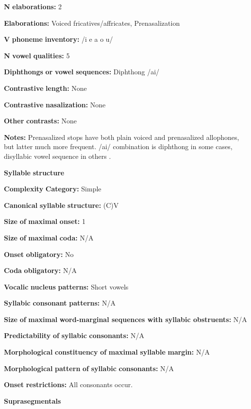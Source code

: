 \textbf{N} \textbf{elaborations:} 2

\textbf{Elaborations:} Voiced fricatives/affricates, Prenasalization

\textbf{V} \textbf{phoneme} \textbf{inventory:} /i e a o u/

\textbf{N} \textbf{vowel} \textbf{qualities:} 5

\textbf{Diphthongs} \textbf{or} \textbf{vowel} \textbf{sequences:} Diphthong /ai/

\textbf{Contrastive} \textbf{length:} None

\textbf{Contrastive} \textbf{nasalization:} None

\textbf{Other} \textbf{contrasts:} None

\textbf{Notes:} Prenasalized stops have both plain voiced and prenasalized allophones, but latter much more frequent. /ai/ combination is diphthong in some cases, disyllabic vowel sequence in others \citep[22]{Wegener2008}.

\textbf{Syllable} \textbf{structure}

\textbf{Complexity} \textbf{Category:} Simple

\textbf{Canonical} \textbf{syllable} \textbf{structure:} (C)V \citep[23-4]{Wegener2008}

\textbf{Size} \textbf{of} \textbf{maximal} \textbf{onset:} 1

\textbf{Size} \textbf{of} \textbf{maximal} \textbf{coda:} N/A

\textbf{Onset} \textbf{obligatory:} No

\textbf{Coda} \textbf{obligatory:} N/A

\textbf{Vocalic} \textbf{nucleus} \textbf{patterns:} Short vowels

\textbf{Syllabic} \textbf{consonant} \textbf{patterns:} N/A

\textbf{Size} \textbf{of} \textbf{maximal} \textbf{word{}-marginal sequences with syllabic obstruents:} N/A

\textbf{Predictability} \textbf{of} \textbf{syllabic} \textbf{consonants:} N/A

\textbf{Morphological} \textbf{constituency} \textbf{of} \textbf{maximal} \textbf{syllable} \textbf{margin:} N/A

\textbf{Morphological} \textbf{pattern} \textbf{of} \textbf{syllabic} \textbf{consonants:} N/A

\textbf{Onset} \textbf{restrictions:} All consonants occur.

\textbf{Suprasegmentals}

